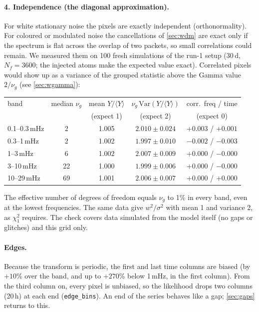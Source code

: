 \documentclass[11pt,a4paper]{article}
\begin{document}
\paragraph{4. Independence (the diagonal approximation).} For white stationary noise
the pixels are exactly independent (orthonormality). For coloured or modulated noise
the cancellations of \cref{sec:wdm} are exact only if the spectrum is flat across the
overlap of two packets, so small correlations could remain. We measured them on 100
fresh simulations of the run-1 setup (30\,d, $N_f=3600$; the injected atoms make the
expected value exact). Correlated pixels would show up as a variance of the grouped
statistic above the Gamma value $2/\nu_g$ (see \cref{sec:wgamma}):
\begin{center}
\small
\begin{tabular}{@{}lcccc@{}}
\toprule
band & median $\nu_g$ & mean $Y/\langle Y\rangle$ & $\nu_g\,\mathrm{Var}(Y/\langle Y\rangle)$ & corr.\ freq / time \\
 & & (expect 1) & (expect 2) & (expect 0) \\
\midrule
0.1--0.3\,mHz & 2  & 1.005 & $2.010\pm0.024$ & $+0.003$ / $+0.001$ \\
0.3--1\,mHz   & 2  & 1.002 & $1.997\pm0.010$ & $-0.002$ / $-0.003$ \\
1--3\,mHz     & 6  & 1.002 & $2.007\pm0.009$ & $+0.000$ / $-0.000$ \\
3--10\,mHz    & 22 & 1.000 & $1.999\pm0.006$ & $+0.000$ / $-0.000$ \\
10--29\,mHz   & 69 & 1.001 & $2.006\pm0.007$ & $+0.000$ / $+0.000$ \\
\bottomrule
\end{tabular}
\end{center}
The effective number of degrees of freedom equals $\nu_g$ to 1\% in every band, even
at the lowest frequencies. The same data give $w^2/\sigma^2$ with mean 1 and variance
2, as $\chi^2_1$ requires. The check covers data simulated from the model itself (no
gaps or glitches) and this grid only.

\paragraph{Edges.} Because the transform is periodic, the first and last time columns
are biased (by $+10\%$ over the band, and up to $+270\%$ below 1\,mHz, in the first
column). From the third column on, every pixel is unbiased, so the likelihood drops
two columns (20\,h) at each end (\texttt{edge\_bins}). An end of the series behaves
like a gap; \cref{sec:gaps} returns to this.
\end{document}
